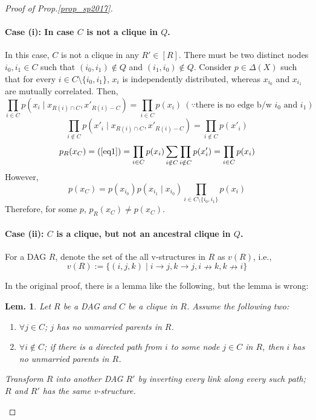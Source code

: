 \documentclass[11pt,a4paper,dvipdfmx]{article}
\theoremstyle{plain}
\newtheorem{lem}{Lem.}[section]
\begin{document}
\begin{proof}[Proof of Prop.\ref{prop_sp2017}]
	\paragraph{Case (i): In case $C$ is not a clique in $Q$.}
	In this case, $C$ is not a clique in any $R' \in [R]$. There must be two distinct nodes $i_0, i_1 \in C$ such that $(i_0, i_1) \notin Q$ and $(i_1, i_0) \notin Q$. Consider $p \in \Delta(X)$ such that for every $i \in C \setminus \{i_0, i_1\}$, $x_i$ is independently distributed, whereas $x_{i_0}$ and $x_{i_1}$ are mutually correlated. Then,
	\[
	\prod_{i \in C} p(x_i \mid x_{R(i) \cap C}, x'_{R(i) - C})
	= \prod_{i \in C}p(x_i) \ (\because \text{there is no edge b/w $i_0$ and $i_1$})
	\]
	\[
	\prod_{i \notin C} p(x'_i \mid x_{R(i) \cap C}, x'_{R(i) - C})
	= \prod_{i \notin C}p(x'_i)
	\]
	\[
	p_R(x_C) = (\text{\ref{eq1}}) =  \prod_{i \in C}p(x_i) \sum_{i \notin C} \prod_{i \notin C}p(x'_i) = \prod_{i \in C}p(x_i)
	\]
	However, 
	\[
	p(x_C) = p(x_{i_0}) p(x_{i_1} \mid x_{i_0}) \prod_{i \in C \setminus \{i_0, i_1\}} p(x_i) 
	\]
	Therefore, for some $p$, $p_R(x_C) \neq p(x_C)$.
	
	\paragraph{Case (ii): $C$ is a clique, but not an ancestral clique in $Q$.}
	For a DAG $R$, denote the set of the all v-structures in $R$ as $v(R)$, i.e., 
	\[
	v(R) := \{(i,j,k) \mid i \to j, k \to j, i \nrightarrow k, k \nrightarrow i \}
	\]
	
	In the original proof, there is a lemma like the following, but the lemma is wrong:
	
	\begin{screen}
	\begin{lem} \label{wrong_lem}
	Let $R$ be a DAG and $C$ be a clique in $R$. Assume the following two:
		\begin{enumerate}
			\item $\forall j \in C$; $j$ has no unmarried parents in $R$.
			\item $\forall i \notin C$; if there is a directed path from $i$ to some node $j \in C$ in $R$, then $i$ has no unmarried parents in $R$.
		\end{enumerate}
		Transform $R$ into another DAG $R'$ by inverting every link along every such path; $R$ and $R'$ has the same v-structure.
	\end{lem}
	\end{screen}
	

\end{proof}
\end{document}
